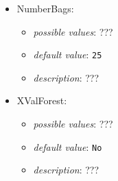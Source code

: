 \documentclass{article}
\begin{document}
\begin{itemize}
    \item NumberBags:
           \begin{itemize}
                \item \emph{possible values}: ???
                \item \emph{default value}: \texttt{25}
                \item \emph{description}: ???
           \end{itemize}
    \item XValForest:
           \begin{itemize}
                \item \emph{possible values}: ???
                \item \emph{default value}: \texttt{No}
                \item \emph{description}: ???
           \end{itemize}
\end{itemize}
\end{document}
